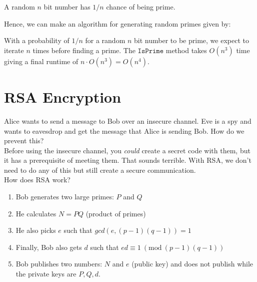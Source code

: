 \documentclass[14pt]{extarticle}
\newcommand{\Mod}[1]{\ (\mathrm{mod}\ #1)}
\begin{document}
    \begin{theorem*}
        A random $n$ bit number has $1 / n$ chance of being prime.
    \end{theorem*}

    Hence, we can make an algorithm for generating random primes given by:

    \begin{algorithm}[H]
    \end{algorithm}

    With a probability of $1/n$ for a random $n$ bit number to be prime,
    we expect to iterate $n$ times before finding a prime. The
    $\texttt{IsPrime}$ method takes $O(n^3)$ time giving a final runtime
    of $n\cdot O(n^3) = O(n^4)$.

    \section*{RSA Encryption}
    Alice wants to send a message to Bob over an insecure channel. Eve
    is a spy and wants to eavesdrop and get the message that Alice is 
    sending Bob. How do we prevent this?\\

    Before using the insecure channel, you \textit{could} create a secret
    code with them, but it has a prerequisite of meeting them. That sounds
    terrible. With RSA, we don't need to do any of this but still create
    a secure communication.\\

    How does RSA work?
    \begin{enumerate}
        \item Bob generates two large primes: $P$ and $Q$
        \item He calculates $N = PQ$ (product of primes)
        \item He also picks $e$ such that $gcd(e, (p-1)(q-1)) = 1$
        \item Finally, Bob also gets $d$ such that $ed\equiv 1\Mod{(p-1)(q-1)}$
        \item Bob publishes two numbers: $N$ and $e$ (public key) and does not
            publish while the private keys are $P, Q, d$.
    \end{enumerate}
\end{document}
